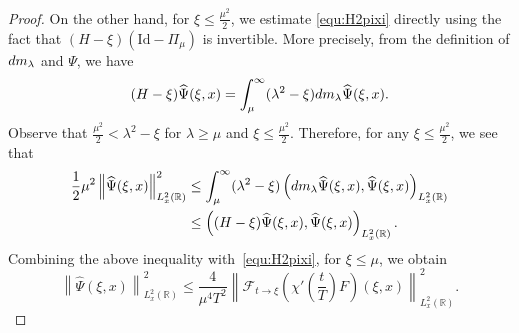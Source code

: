 \documentclass[a4paper,reqno]{amsart}
\theoremstyle{definition}
\numberwithin{equation}{section}
\newcommand{\R}{\mathbb{R}}
\def \R {{\mathbb{R} }}
\def \d {{\rm{d}}}
\begin{document}
\begin{proof}
\smallskip
    On the other hand, for $\xi\le \frac{\mu^2}{2}$, we estimate \eqref{equ:H2pixi} directly using the fact that $(H-\xi)(\mathrm{Id}-\Pi_{\mu})$ is invertible.  More precisely, from the definition of $\d m_{\lambda}$ and $\Psi$, we have
    \begin{equation*}
       (H- \xi)\widehat{\Psi}(\xi,x)=\int_{\mu}^{\infty}(\lambda^{2}- \xi)\d m_{\lambda}\widehat{\Psi}(\xi,x).        \end{equation*}
 Observe that $\frac{\mu^2}{2}<\lambda^2-\xi$ for $\lambda\geq \mu$ and $\xi\leq \frac{\mu^2}{2}$.  Therefore, for any $\xi\le \frac{\mu^2}{2}$,  we see that
    \begin{equation*}
    \begin{aligned}
    \frac{1}{2}\mu^{2}\left\|\widehat{\Psi}(\xi,x)\right\|^{2}_{L_{x}^{2}(\R)}
         &\le \int_{\mu}^{\infty}(\lambda^{2}-\xi)\left(\d m_{\lambda}\widehat{\Psi}(\xi,x),\widehat{\Psi}(\xi,x)\right)_{L_{x}^{2}(\R)} \\
         &\le \left((H- \xi)\widehat{\Psi}(\xi,x),\widehat{\Psi}(\xi,x)\right)_{L_{x}^{2}(\R)}.      \end{aligned}
         \end{equation*}
    Combining the above inequality with~\eqref{equ:H2pixi}, for $\xi \le \mu$, we obtain
    \begin{equation}\label{est:Psi2}
        \left\|\widehat{\Psi}(\xi,x)\right\|^{2}_{L_{x}^{2}(\R)}\le \frac{4}{\mu^{4} T^{2}}\left\|\mathcal{F}_{t\to \xi}\left({\chi'\left(\frac{t}{T}\right)F}\right)(\xi,x)\right\|_{L_{x}^{2}(\R)}^{2}.
        \end{equation}


\end{proof}
\end{document}
